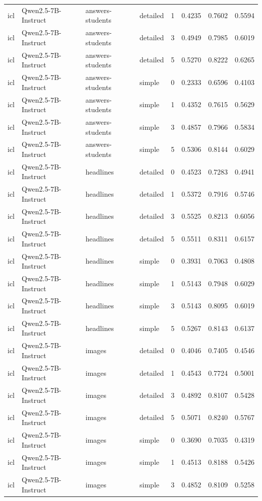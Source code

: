 \begin{longtable}{llllrrrr}
icl & Qwen2.5-7B-Instruct & answers-students & detailed & 1 & 0.4235 & 0.7602 & 0.5594 \\
icl & Qwen2.5-7B-Instruct & answers-students & detailed & 3 & 0.4949 & 0.7985 & 0.6019 \\
icl & Qwen2.5-7B-Instruct & answers-students & detailed & 5 & 0.5270 & 0.8222 & 0.6265 \\
icl & Qwen2.5-7B-Instruct & answers-students & simple & 0 & 0.2333 & 0.6596 & 0.4103 \\
icl & Qwen2.5-7B-Instruct & answers-students & simple & 1 & 0.4352 & 0.7615 & 0.5629 \\
icl & Qwen2.5-7B-Instruct & answers-students & simple & 3 & 0.4857 & 0.7966 & 0.5834 \\
icl & Qwen2.5-7B-Instruct & answers-students & simple & 5 & 0.5306 & 0.8144 & 0.6029 \\
icl & Qwen2.5-7B-Instruct & headlines & detailed & 0 & 0.4523 & 0.7283 & 0.4941 \\
icl & Qwen2.5-7B-Instruct & headlines & detailed & 1 & 0.5372 & 0.7916 & 0.5746 \\
icl & Qwen2.5-7B-Instruct & headlines & detailed & 3 & 0.5525 & 0.8213 & 0.6056 \\
icl & Qwen2.5-7B-Instruct & headlines & detailed & 5 & 0.5511 & 0.8311 & 0.6157 \\
icl & Qwen2.5-7B-Instruct & headlines & simple & 0 & 0.3931 & 0.7063 & 0.4808 \\
icl & Qwen2.5-7B-Instruct & headlines & simple & 1 & 0.5143 & 0.7948 & 0.6029 \\
icl & Qwen2.5-7B-Instruct & headlines & simple & 3 & 0.5143 & 0.8095 & 0.6019 \\
icl & Qwen2.5-7B-Instruct & headlines & simple & 5 & 0.5267 & 0.8143 & 0.6137 \\
icl & Qwen2.5-7B-Instruct & images & detailed & 0 & 0.4046 & 0.7405 & 0.4546 \\
icl & Qwen2.5-7B-Instruct & images & detailed & 1 & 0.4543 & 0.7724 & 0.5001 \\
icl & Qwen2.5-7B-Instruct & images & detailed & 3 & 0.4892 & 0.8107 & 0.5428 \\
icl & Qwen2.5-7B-Instruct & images & detailed & 5 & 0.5071 & 0.8240 & 0.5767 \\
icl & Qwen2.5-7B-Instruct & images & simple & 0 & 0.3690 & 0.7035 & 0.4319 \\
icl & Qwen2.5-7B-Instruct & images & simple & 1 & 0.4513 & 0.8188 & 0.5426 \\
icl & Qwen2.5-7B-Instruct & images & simple & 3 & 0.4852 & 0.8109 & 0.5258 \\

\end{longtable}
